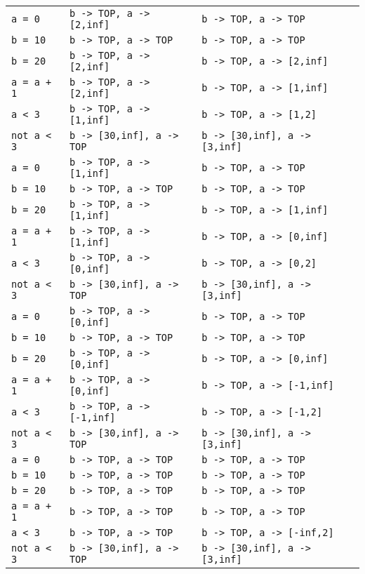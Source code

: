 \documentclass[11pt]{article}
\newcounter{rowcount}
\begin{document}
\begin{tabular}{@{\stepcounter{rowcount}\therowcount.)\hspace*{\tabcolsep}}llll}
 \verb|a = 0| & \verb|b -> TOP, a -> [2,inf]| & \verb|b -> TOP, a -> TOP| \\
 \verb|b = 10| & \verb|b -> TOP, a -> TOP| & \verb|b -> TOP, a -> TOP| \\
 \verb|b = 20| & \verb|b -> TOP, a -> [2,inf]| & \verb|b -> TOP, a -> [2,inf]| \\
 \verb|a = a + 1| & \verb|b -> TOP, a -> [2,inf]| & \verb|b -> TOP, a -> [1,inf]| \\
 \verb|a < 3| & \verb|b -> TOP, a -> [1,inf]| & \verb|b -> TOP, a -> [1,2]| \\
 \verb|not a < 3| & \verb|b -> [30,inf], a -> TOP| & \verb|b -> [30,inf], a -> [3,inf]| \\
 \verb|a = 0| & \verb|b -> TOP, a -> [1,inf]| & \verb|b -> TOP, a -> TOP| \\
 \verb|b = 10| & \verb|b -> TOP, a -> TOP| & \verb|b -> TOP, a -> TOP| \\
 \verb|b = 20| & \verb|b -> TOP, a -> [1,inf]| & \verb|b -> TOP, a -> [1,inf]| \\
 \verb|a = a + 1| & \verb|b -> TOP, a -> [1,inf]| & \verb|b -> TOP, a -> [0,inf]| \\
 \verb|a < 3| & \verb|b -> TOP, a -> [0,inf]| & \verb|b -> TOP, a -> [0,2]| \\
 \verb|not a < 3| & \verb|b -> [30,inf], a -> TOP| & \verb|b -> [30,inf], a -> [3,inf]| \\
 \verb|a = 0| & \verb|b -> TOP, a -> [0,inf]| & \verb|b -> TOP, a -> TOP| \\
 \verb|b = 10| & \verb|b -> TOP, a -> TOP| & \verb|b -> TOP, a -> TOP| \\
 \verb|b = 20| & \verb|b -> TOP, a -> [0,inf]| & \verb|b -> TOP, a -> [0,inf]| \\
 \verb|a = a + 1| & \verb|b -> TOP, a -> [0,inf]| & \verb|b -> TOP, a -> [-1,inf]| \\
 \verb|a < 3| & \verb|b -> TOP, a -> [-1,inf]| & \verb|b -> TOP, a -> [-1,2]| \\
 \verb|not a < 3| & \verb|b -> [30,inf], a -> TOP| & \verb|b -> [30,inf], a -> [3,inf]| \\
 \verb|a = 0| & \verb|b -> TOP, a -> TOP| & \verb|b -> TOP, a -> TOP| \\
 \verb|b = 10| & \verb|b -> TOP, a -> TOP| & \verb|b -> TOP, a -> TOP| \\
 \verb|b = 20| & \verb|b -> TOP, a -> TOP| & \verb|b -> TOP, a -> TOP| \\
 \verb|a = a + 1| & \verb|b -> TOP, a -> TOP| & \verb|b -> TOP, a -> TOP| \\
 \verb|a < 3| & \verb|b -> TOP, a -> TOP| & \verb|b -> TOP, a -> [-inf,2]| \\
 \verb|not a < 3| & \verb|b -> [30,inf], a -> TOP| & \verb|b -> [30,inf], a -> [3,inf]| \\
\end{tabular}
\end{document}
